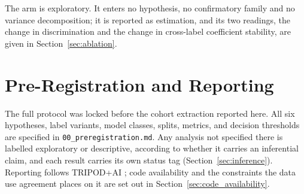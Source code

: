 The arm is exploratory. It enters no hypothesis, no confirmatory family and no
variance decomposition; it is reported as estimation, and its two readings, the change in discrimination and the change in cross-label coefficient
stability, are given in Section~\ref{sec:ablation}.


\section{Pre-Registration and Reporting}

The full protocol was locked before the cohort extraction reported here. All
six hypotheses,
label variants, model classes, splits, metrics, and decision thresholds are
specified in \texttt{00\_preregistration.md}. Any analysis not specified there
is labelled exploratory or descriptive, according to whether it carries an
inferential claim, and each result carries its own status tag
(Section~\ref{sec:inference}).
Reporting follows TRIPOD+AI \cite{collins2024tripodai}; code availability and
the constraints the data use agreement places on it are set out in
Section~\ref{sec:code_availability}.
